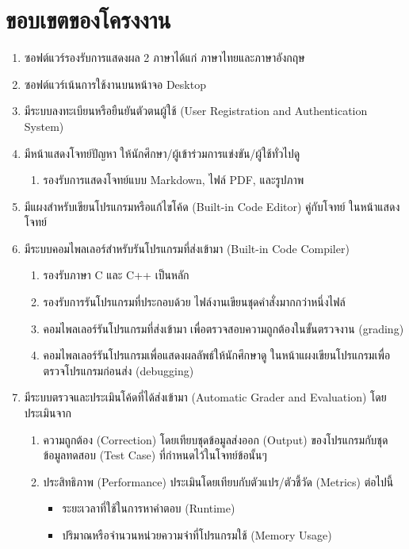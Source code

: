 \documentclass[12pt,oneside,openright,a4paper]{cpe-thai-project}
\begin{document}
\section{ขอบเขตของโครงงาน}
\begin{enumerate}
    \item ซอฟต์แวร์รองรับการแสดงผล 2 ภาษาได้แก่ ภาษาไทยและภาษาอังกฤษ
    \item ซอฟต์แวร์เน้นการใช้งานบนหน้าจอ Desktop
    \item มีระบบลงทะเบียนหรือยืนยันตัวตนผู้ใช้ (User Registration and Authentication System)
    \item มีหน้าแสดงโจทย์ปัญหา ให้นักศึกษา/ผู้เข้าร่วมการแข่งขัน/ผู้ใช้ทั่วไปดู
    \begin{enumerate}
        \item รองรับการแสดงโจทย์แบบ Markdown, ไฟล์ PDF, และรูปภาพ
    \end{enumerate}
    \item มีแผงสำหรับเขียนโปรแกรมหรือแก้ไขโค้ด (Built-in Code Editor) คู่กับโจทย์ ในหน้าแสดงโจทย์
    \item มีระบบคอมไพลเลอร์สำหรับรันโปรแกรมที่ส่งเข้ามา (Built-in Code Compiler)
    \begin{enumerate}
        \item รองรับภาษา C และ C++ เป็นหลัก
        \item รองรับการรันโปรแกรมที่ประกอบด้วย ไฟล์งานเขียนชุดคำสั่งมากกว่าหนึ่งไฟล์
        \item คอมไพลเลอร์รันโปรแกรมที่ส่งเข้ามา เพื่อตรวจสอบความถูกต้องในขั้นตรวจงาน (grading)
        \item คอมไพลเลอร์รันโปรแกรมเพื่อแสดงผลลัพธ์ให้นักศึกษาดู ในหน้าแผงเขียนโปรแกรมเพื่อตรวจโปรแกรมก่อนส่ง (debugging)
    \end{enumerate} 
    \item มีระบบตรวจและประเมินโค้ดที่ได้ส่งเข้ามา (Automatic Grader and Evaluation) โดยประเมินจาก
    \begin{enumerate}
        \item ความถูกต้อง (Correction) โดยเทียบชุดข้อมูลส่งออก (Output) ของโปรแกรมกับชุดข้อมูลทดสอบ (Test Case) ที่กำหนดไว้ในโจทย์ข้อนั้นๆ
        \item ประสิทธิภาพ (Performance) ประเมินโดยเทียบกับตัวแปร/ตัวชี้วัด (Metrics) ต่อไปนี้
        \begin{itemize}
            \item ระยะเวลาที่ใช้ในการหาคำตอบ (Runtime)
            \item ปริมาณหรือจำนวนหน่วยความจำที่โปรแกรมใช้ (Memory Usage)
        \end{itemize}

\end{enumerate}
\end{enumerate}
\end{document}
